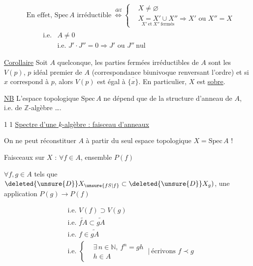 \[
\begin{aligned}
&\text{En effet, $\mathrm{Spec}\,A$ irréductible}\ \overset{\text{déf}}{\Longleftrightarrow}
\left\{\begin{aligned}
&X\ne\varnothing\\
&\underset{X'\ \mathrm{et}\ X''\ \mathrm{fermés}}{X=X'\cup X''}\Rightarrow X'\text{ ou }X''=X
\end{aligned}\right.\\[-1pt]
&\qquad\begin{array}{l|l}
\text{i.e.}& A\ne0\\
&\text{i.e. }J'\cdot J''=0\Rightarrow J'\text{ ou }J''\ \text{nul}
\end{array}
\end{aligned}
\]

\uline{Corollaire} Soit $A$ quelconque,  les parties fermées irréductibles de $A$ sont les $V(p)$, $p$ idéal premier de $A$ (correspondance biunivoque  renversant l'ordre) et  si $x$ correspond à $p$, alors $V(p)$ est égal à $\overline{\{x\}}$. En particulier, $X$ est \uline{sobre}.



\uline{NB} L'espace topologique $\mathrm{Spec}\,A$ ne dépend que de la structure d'anneau de $A$, i.e. de $\mathbb Z$-algèbre \ldots.

\textcircled{11} \uline{Spectre d'une $k$-algèbre : faisceau d'anneaux}

On ne peut réconstituer $A$ à partir du seul espace topologique $X=\mathrm{Spec}\,A$ !

Faisceaux sur $X$ : $\forall f\in A$, ensemble $P(f)$

$\forall f,g\in A$ tels que $\deleted{\unsure{D}}X_{\unsure{fS|f}}\subset \deleted{\unsure{D}}X_g)$, une application $P(g)\to P(f)$

\[
\begin{aligned}
&\text{i.e. }V(f)\supset V(g)\\
&\text{i.e. }\widetilde{fA}\subset\widetilde{gA}\\
&\text{i.e. }f\in\widetilde{gA}\\
&\text{i.e. }\left\{\begin{aligned}&\exists\,n\in\mathbb N,\ f^n=gh\\&h\in A\end{aligned}\right.\ \big|\ \text{écrivons } f\prec g
\end{aligned}
\]

